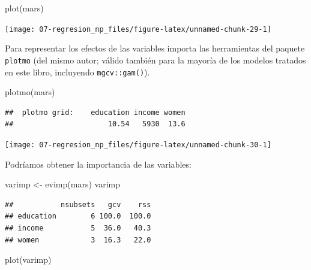 \documentclass[
  spanish,
]{book}
\newenvironment{Shaded}{\begin{snugshade}}{\end{snugshade}}
\newcommand{\FunctionTok}[1]{\textcolor[rgb]{0.00,0.00,0.00}{#1}}
\newcommand{\NormalTok}[1]{#1}
\newcommand{\OtherTok}[1]{\textcolor[rgb]{0.56,0.35,0.01}{#1}}
\theoremstyle{break}
\theoremstyle{definition}
\theoremstyle{definition}
\theoremstyle{definition}
\theoremstyle{definition}
\theoremstyle{remark}
\begin{document}
\begin{Shaded}
\begin{Highlighting}[]
\FunctionTok{plot}\NormalTok{(mars)}
\end{Highlighting}
\end{Shaded}

\begin{center}\texttt{[image: 07-regresion\_np\_files/figure-latex/unnamed-chunk-29-1]} \end{center}

Para representar los efectos de las variables importa las herramientas del paquete \texttt{plotmo} (del mismo autor; válido también para la mayoría de los modelos tratados en este libro, incluyendo \texttt{mgcv::gam()}).

\begin{Shaded}
\begin{Highlighting}[]
\FunctionTok{plotmo}\NormalTok{(mars)}
\end{Highlighting}
\end{Shaded}

\begin{verbatim}
##  plotmo grid:    education income women
##                      10.54   5930  13.6
\end{verbatim}

\begin{center}\texttt{[image: 07-regresion\_np\_files/figure-latex/unnamed-chunk-30-1]} \end{center}

Podríamos obtener la importancia de las variables:

\begin{Shaded}
\begin{Highlighting}[]
\NormalTok{varimp }\OtherTok{\textless{}{-}} \FunctionTok{evimp}\NormalTok{(mars)}
\NormalTok{varimp}
\end{Highlighting}
\end{Shaded}

\begin{verbatim}
##           nsubsets   gcv    rss
## education        6 100.0  100.0
## income           5  36.0   40.3
## women            3  16.3   22.0
\end{verbatim}

\begin{Shaded}
\begin{Highlighting}[]
\FunctionTok{plot}\NormalTok{(varimp)}
\end{Highlighting}
\end{Shaded}
\end{document}
